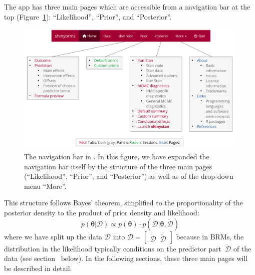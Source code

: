 The  app has three main pages which are accessible from a
navigation bar at the top (Figure~\ref{fig:navbar-tree}):
``Likelihood'', ``Prior'', and ``Posterior''.
\begin{figure}[t!]
  \centering
  \includegraphics[width=\textwidth]{Figures/navbar_tree.pdf}
  \caption[Navigation bar]{The navigation bar in .
  In this figure, we have expanded the navigation bar itself by the structure of the
  three main pages (``Likelihood'', ``Prior'', and ``Posterior'') as well as of the
  drop-down menu ``More''.}
  \label{fig:navbar-tree}
\end{figure}%
This structure follows Bayes' theorem, simplified to the proportionality of
the posterior density to the product of prior density and likelihood:
\begin{equation}
p(\boldsymbol{\theta} | \boldsymbol{\mathcal{D}}) \propto
p(\boldsymbol{\theta}) \cdot
p(\boldsymbol{\dot{\mathcal{D}}} | \boldsymbol{\theta}, \boldsymbol{\ddot{\mathcal{D}}})
  \label{eqn:bayes}
\end{equation}
where we have split up the data $\boldsymbol{\mathcal{D}}$ into
$\boldsymbol{\mathcal{D}} = \begin{bmatrix}\boldsymbol{\dot{\mathcal{D}}}
\;\; \boldsymbol{\ddot{\mathcal{D}}}\end{bmatrix}$
because in BRMs, the distribution in the likelihood typically conditions on the predictor
part~$\boldsymbol{\ddot{\mathcal{D}}}$ of the data (see section~ below).
In the following sections, these three main pages will be described in detail.

